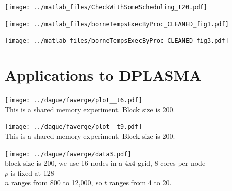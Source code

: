 \begin{frame}

\texttt{[image: ../matlab\_files/CheckWithSomeScheduling\_t20.pdf]}\\

\end{frame}



\begin{frame}

\texttt{[image: ../matlab\_files/borneTempsExecByProc\_CLEANED\_fig1.pdf]}\\

\end{frame}



\begin{frame}

\texttt{[image: ../matlab\_files/borneTempsExecByProc\_CLEANED\_fig3.pdf]}\\

\end{frame}

\section{Applications to DPLASMA}

\begin{frame}

\texttt{[image: ../dague/faverge/plot\_\_t6.pdf]}\\

This is a shared memory experiment. Block size is 200.


\end{frame}


\begin{frame}

\texttt{[image: ../dague/faverge/plot\_\_t9.pdf]}\\

This is a shared memory experiment. Block size is 200.

\end{frame}



\begin{frame}

\texttt{[image: ../dague/faverge/data3.pdf]}\\
block size is 200, we use 16 nodes in a 4x4 grid, 8 cores per node\\
$p$ is fixed at 128\\
$n$ ranges from 800 to 12,000, so $t$ ranges from 4 to 20.


\end{frame}


